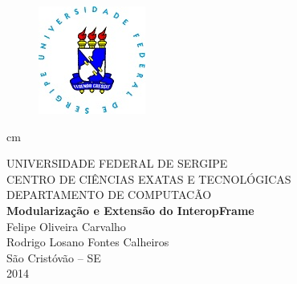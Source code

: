 

\thispagestyle{empty}
\begin{titlepage}
    \begin{figure}
        \centering
        \includegraphics[keepaspectratio = true, scale=1]{ufs.jpg} \label{fig:logoUFS}
    \end{figure}
     cm
    \begin{center}
        {\Large UNIVERSIDADE FEDERAL DE SERGIPE \\ CENTRO DE CI\^ENCIAS EXATAS E TECNOL\'OGICAS \\ DEPARTAMENTO DE COMPUTAC\~AO }\\
        \vspace{6cm}
        {\bf \LARGE Modularização e Extensão do InteropFrame}\\
        \vspace{3cm}
        {\large Felipe Oliveira Carvalho}\\
				{\large Rodrigo Losano Fontes Calheiros}\\
        \vfill
        \large{S\~ao Crist\'ov\~ao -- SE\\ 2014}
    \end{center}
\end{titlepage}


